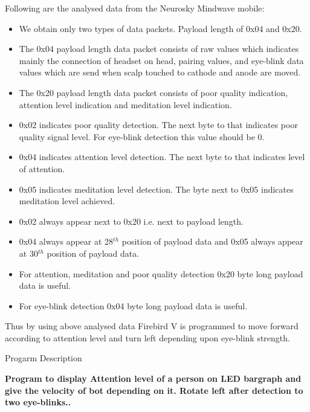 \documentclass[14pt]{article}
\begin{document}
{\raggedright
Following are the analysed data from the Neurosky Mindwave mobile:
}

\begin{itemize}
	\item We obtain only two types of data packets. Payload length of 0x04 and 0x20. 
	\item The 0x04 payload length data packet consists of raw values which indicates mainly the connection of headset on head, pairing values, and eye-blink data values which are send when scalp touched to cathode and anode are moved.
	\item The 0x20 payload length data packet consists of poor quality indication, attention level indication and meditation level indication.
	\item 0x02 indicates poor quality detection. The next byte to that indicates poor quality signal level. For eye-blink detection this value should be 0.
	\item 0x04 indicates attention level detection. The next byte to that indicates level of attention.
	\item 0x05 indicates meditation level detection. The byte next to 0x05 indicates meditation level achieved.
	\item 0x02 always appear next to 0x20 i.e. next to payload length.
	\item 0x04 always appear at 28$^{th}$ position of payload data and 0x05 always appear
at 30$^{th}$ position of payload data.
	\item For attention, meditation and poor quality detection 0x20 byte long payload data is useful.
	\item For eye-blink detection 0x04 byte long payload data is useful.
\end{itemize}

Thus by using above analysed data Firebird V is programmed to move forward according to attention level and turn left depending upon eye-blink strength.

\break

\begin{center}
{\Huge Progarm Description}
\end{center}

\textbf{{\large Program to display Attention level of a person on LED bargraph and give the velocity of bot depending on it. Rotate left after detection to two eye-blinks..}}
\end{document}
